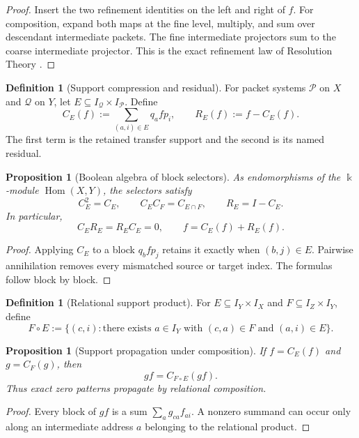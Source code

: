 \documentclass[11pt]{article}
\newtheorem{proposition}[theorem]{Proposition}
\theoremstyle{definition}
\newtheorem{definition}[theorem]{Definition}
\theoremstyle{remark}
\newcommand{\kk}{\Bbbk}
\begin{document}
\begin{proof}
Insert the two refinement identities on the left and right of \(f\).  For composition, expand both maps at the fine level, multiply, and sum over descendant intermediate packets.  The fine intermediate projectors sum to the coarse intermediate projector.  This is the exact refinement law of Resolution Theory \cite{RT}.
\end{proof}

\begin{definition}[Support compression and residual]
\label{def:support-compression-expanded}
For packet systems \(\mathcal P\) on \(X\) and \(\mathcal Q\) on \(Y\), let \(E\subseteq I_{\mathcal Q}\times I_{\mathcal P}\).  Define
\[
C_E(f):=\sum_{(a,i)\in E}q_afp_i,
\qquad
R_E(f):=f-C_E(f).
\]
The first term is the retained transfer support and the second is its named residual.
\end{definition}

\begin{proposition}[Boolean algebra of block selectors]
\label{prop:block-selector-algebra}
As endomorphisms of the \(\kk\)-module \(\operatorname{Hom}(X,Y)\), the selectors satisfy
\[
C_E^2=C_E,
\qquad
C_EC_F=C_{E\cap F},
\qquad
R_E=I-C_E.
\]
In particular,
\[
C_ER_E=R_EC_E=0,
\qquad
f=C_E(f)+R_E(f).
\]
\end{proposition}

\begin{proof}
Applying \(C_E\) to a block \(q_bfp_j\) retains it exactly when \((b,j)\in E\).  Pairwise annihilation removes every mismatched source or target index.  The formulas follow block by block.
\end{proof}

\begin{definition}[Relational support product]
\label{def:relational-support-product}
For \(E\subseteq I_Y\times I_X\) and \(F\subseteq I_Z\times I_Y\), define
\[
F\circ E
:=
\{(c,i):\text{there exists }a\in I_Y
\text{ with }(c,a)\in F\text{ and }(a,i)\in E\}.
\]
\end{definition}

\begin{proposition}[Support propagation under composition]
\label{prop:support-propagation}
If \(f=C_E(f)\) and \(g=C_F(g)\), then
\[
gf=C_{F\circ E}(gf).
\]
Thus exact zero patterns propagate by relational composition.
\end{proposition}

\begin{proof}
Every block of \(gf\) is a sum \(\sum_a g_{ca}f_{ai}\).  A nonzero summand can occur only along an intermediate address \(a\) belonging to the relational product.
\end{proof}
\end{document}
